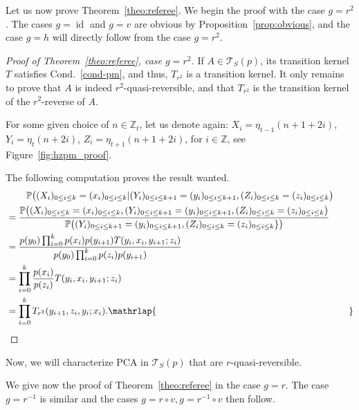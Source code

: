 \documentclass[10pt]{amsart}
\theoremstyle{definition}\newtheorem{defi}[theo]{Definition}\newtheorem{rema}[theo]{Remark}\newtheorem{exam}[theo]{Example}\newtheorem{exem}[theo]{Example}\newtheorem{nota}[theo]{Notation}
\newcounter{a}
\newcommand{\Cond}{Cond.}
\newcommand{\triang}[2]{\mathcal{T}_{#1} \left(#2 \right)}
\newcommand{\triangE}[1]{\mathcal{T}_{#1}}
\DeclareMathOperator{\id}{id}
\newcommand{\Z}{\mathbb{Z}}
\newcommand{\Pbb}{\mathbb{P}}
\begin{document}
Let us now prove Theorem~\ref{theo:referee}. We begin the proof with the case $g=r^2$. The cases $g=\id$ and $g=v$ are obvious by Proposition~\ref{prop:obvious}, and the case $g=h$ will directly follow from the case $g=r^2$.



\begin{proof}[Proof of Theorem~\ref{theo:referee}, case $g=r^2$]
If $A\in\triang{S}{p}$, its transition kernel $T$ satisfies \Cond~\ref{cond-pm}, and thus, $T_{r^2}$ is a transition kernel. It only remains to prove that $A$ is indeed $r^{2}$-quasi-reversible, and that $T_{r^2}$ is the transition kernel of the $r^2$-reverse of $A$.



For some given choice of $n\in\Z_{t}$, let us denote again: $X_i=\eta_{t-1}(n+1+2i)$,\linebreak $Y_i=\eta_{t}(n+2i)$, $Z_i=\eta_{t+1}(n+1+2i)$, for $i\in \Z$, see Figure~\ref{fig:hzpm_proof}.

The following computation proves the result wanted.
\begin{multline*}
\Pbb\big((X_i)_{0\leq i\leq k} = (x_i)_{0\leq i\leq k} |(Y_i)_{0\leq i\leq k+1} = (y_i)_{0\leq i\leq k+1}, (Z_i)_{0\leq i\leq k} = (z_i)_{0\leq i\leq k}\big)\\
\begin{aligned}
&=\frac{\Pbb\big((X_i)_{0\leq i\leq k} = (x_i)_{0\leq i\leq k},(Y_i)_{0\leq i\leq k+1} = (y_i)_{0\leq i\leq k+1}, (Z_i)_{0\leq i\leq k} = (z_i)_{0\leq i\leq k}\big)}{\Pbb\big((Y_i)_{0\leq i\leq k+1} = (y_i)_{0\leq i\leq k+1}, (Z_i)_{0\leq i\leq k} = (z_i)_{0\leq i\leq k}\}\big)}\\
&=\frac{p(y_0) \prod_{i=0}^k p(x_i)p(y_{i+1}) T(y_i,x_i,y_{i+1};z_i)}{p(y_{0}) \prod_{i=0}^k p(z_i) p(y_{i+1})}\\
&=\prod_{i=0}^k \frac{p(x_i)}{p(z_i)} T(y_i,x_i,y_{i+1};z_i)\\
&=\prod_{i=0}^k T_{r^2}(y_{i+1},z_i,y_i ; x_i). \mathrlap{\mkern 373mu\qed}
\end{aligned}
\end{multline*}
\let\qed\relax
\end{proof}

Now, we will characterize PCA in $\triangE{S}(p)$ that are $r$-quasi-reversible.

We give now the proof of Theorem~\ref{theo:referee} in the case $g=r$. The case $g=r^{-1}$ is similar and the cases $g=r\circ v, g=r^{-1}\circ v$ then follow.
\end{document}
